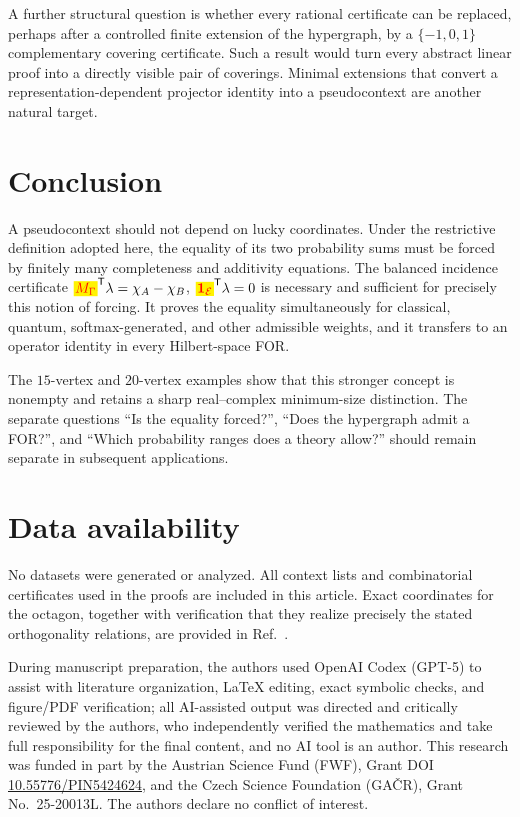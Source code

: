 \documentclass[
  twocolumn,
  aps,
  pra,
  floatfix,
  amsmath,amssymb,
  longbibliography
]{revtex4-2}
\theoremstyle{definition}
\theoremstyle{remark}
\newcommand{\E}{\mathcal E}
\newcommand{\one}{\mathbf 1}
\newcommand{\corrmath}[1]{\begingroup\setlength{\fboxsep}{1pt}\colorbox{yellow}{\ensuremath{\color{red}#1}}\endgroup}
\begin{document}
A further structural question is whether every rational certificate can be
replaced, perhaps after a controlled finite extension of the hypergraph, by a
$\{-1,0,1\}$ complementary covering certificate.  Such a result would turn
every abstract linear proof into a directly visible pair of coverings.
Minimal extensions that convert a representation-dependent projector
identity into a pseudocontext are another natural target.

\section{Conclusion}

A pseudocontext should not depend on lucky coordinates.  Under the
restrictive definition adopted here, the equality of its two probability
sums must be forced by finitely many completeness and additivity equations.
The balanced incidence certificate
$\corrmath{M_\Gamma}^{\mathsf T}\lambda=\chi_A-\chi_B$,
$\corrmath{\one_\E}^{\mathsf T}\lambda=0$ is necessary and sufficient for precisely this
notion of forcing.  It proves the equality simultaneously for classical,
quantum, softmax-generated, and other admissible weights, and it transfers to
an operator identity in every Hilbert-space FOR.

The $15$-vertex and $20$-vertex examples show that this stronger concept is
nonempty and retains a sharp real--complex minimum-size distinction.  The
separate questions ``Is the equality forced?'', ``Does the hypergraph admit
a FOR?'', and ``Which probability ranges does a theory
allow?'' should remain separate in subsequent applications.

\section*{Data availability} No datasets were generated or analyzed. All context lists and combinatorial certificates used in the proofs are included in this article. Exact coordinates for the octagon, together with verification that they realize precisely the stated orthogonality relations, are provided in Ref.~\cite{2026-Navara-Svozil-complex-only-3d-hypergraphs}.

\begin{acknowledgments}
During manuscript preparation, the authors used OpenAI Codex (GPT-5) to assist with literature organization, LaTeX editing, exact symbolic checks, and figure/PDF verification; all AI-assisted output was directed and critically reviewed by the authors, who independently verified the mathematics and take full responsibility for the final content, and no AI tool is an author.
This research was funded in part by the Austrian
Science Fund (FWF), Grant DOI \href{https://doi.org/10.55776/PIN5424624}{10.55776/PIN5424624}, and the Czech Science
Foundation (GA\v{C}R), Grant No.~25-20013L.  The authors declare no
conflict of interest.
\end{acknowledgments}


\end{document}
